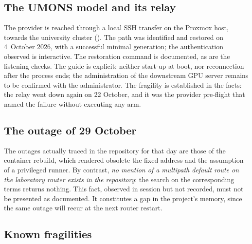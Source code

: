 \subsection{The UMONS model and its relay}

The  provider is reached through a local SSH transfer on the
Proxmox host, towards the university cluster (). The
path was identified and restored on 4~October 2026, with a successful minimal
generation; the authentication observed is interactive. The restoration command is
documented, as are the listening checks. The guide is explicit: neither start-up
at boot, nor reconnection after the process ends; the administration of the
downstream GPU server remains to be confirmed with the administrator. The
fragility is established in the facts: the relay went down again on 22 October,
and it was the provider pre-flight that named the failure without executing any
arm.

\subsection{The outage of 29 October}

The outages actually traced in the repository for that day are those of the
container rebuild, which rendered obsolete the fixed address and the assumption of
a privileged runner. By contrast, \emph{no mention of a multipath default route on
the laboratory router exists in the repository}: the search on the corresponding
terms returns nothing. This fact, observed in session but not recorded, must not be
presented as documented. It constitutes a gap in the project's memory, since the
same outage will recur at the next router restart.

\subsection{Known fragilities}

